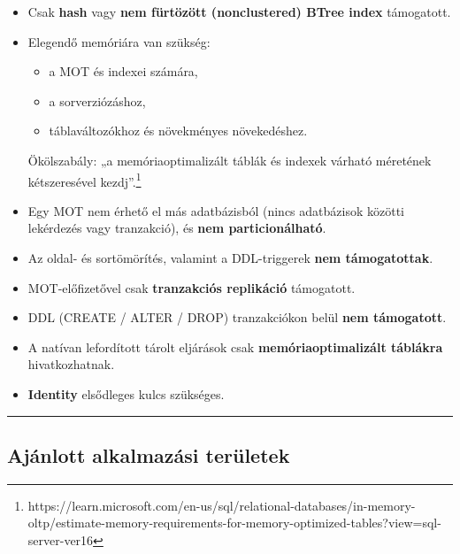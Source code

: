 \documentclass[
  magyar,
]{article}
\providecommand{\tightlist}{%
  \setlength{\itemsep}{0pt}\setlength{\parskip}{0pt}}
\begin{document}
\begin{itemize}
\item
  Csak \textbf{hash} vagy \textbf{nem fürtözött (nonclustered) BTree
  index} támogatott.
\item
  Elegendő memóriára van szükség:

  \begin{itemize}
  \tightlist
  \item
    a MOT és indexei számára,
  \item
    a sorverziózáshoz,
  \item
    táblaváltozókhoz és növekményes növekedéshez.
  \end{itemize}

  Ökölszabály: „a memóriaoptimalizált táblák és indexek várható
  méretének kétszeresével kezdj''.\footnote{https://learn.microsoft.com/en-us/sql/relational-databases/in-memory-oltp/estimate-memory-requirements-for-memory-optimized-tables?view=sql-server-ver16}
\item
  Egy MOT nem érhető el más adatbázisból (nincs adatbázisok közötti
  lekérdezés vagy tranzakció), és \textbf{nem particionálható}.
\item
  Az oldal- és sortömörítés, valamint a DDL-triggerek \textbf{nem
  támogatottak}.
\item
  MOT-előfizetővel csak \textbf{tranzakciós replikáció} támogatott.
\item
  DDL (CREATE / ALTER / DROP) tranzakciókon belül \textbf{nem
  támogatott}.
\item
  A natívan lefordított tárolt eljárások csak
  \textbf{memóriaoptimalizált táblákra} hivatkozhatnak.
\item
  \textbf{Identity} elsődleges kulcs szükséges.
\end{itemize}

\begin{center}\rule{0.5\linewidth}{0.5pt}\end{center}

\subsection{Ajánlott alkalmazási
területek}\label{ajuxe1nlott-alkalmazuxe1si-teruxfcletek}
\end{document}
